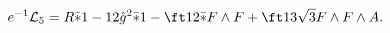 \begin{equation}
e^{-1}{\cal L}_5=R\bar*1-12\hat g^2\bar*1
-\ft12\bar*F\wedge F+\ft1{3\sqrt{3}}F\wedge F\wedge A.
\end{equation}

